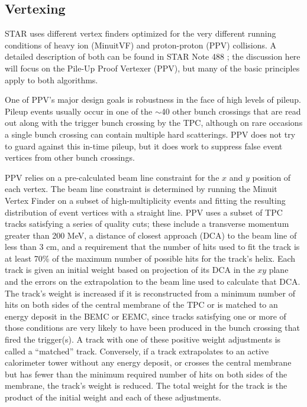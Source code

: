 \subsection{Vertexing}

STAR uses different vertex finders optimized for the very different running
conditions of heavy ion (MinuitVF) and proton-proton (PPV) collisions. A
detailed description of both can be found in STAR Note 488
\cite{vertex-finder-starnote}; the discussion here will focus on the Pile-Up
Proof Vertexer (PPV), but many of the basic principles apply to both
algorithms.

One of PPV's major design goals is robustness in the face of high levels of
pileup. Pileup events usually occur in one of the $\sim$40 other bunch
crossings that are read out along with the trigger bunch crossing by the TPC,
although on rare occasions a single bunch crossing can contain multiple hard
scatterings. PPV does not try to guard against this in-time pileup, but it
does work to suppress false event vertices from other bunch crossings.

PPV relies on a pre-calculated beam line constraint for the $x$ and $y$
position of each vertex. The beam line constraint is determined by running the
Minuit Vertex Finder on a subset of high-multiplicity events and fitting the
resulting distribution of event vertices with a straight line. PPV uses a
subset of TPC tracks satisfying a series of quality cuts; these include a
transverse momentum greater than 200 MeV, a distance of closest approach (DCA)
to the beam line of less than 3 cm, and a requirement that the number of hits
used to fit the track is at least 70\% of the maximum number of possible hits
for the track's helix. Each track is given an initial weight based on
projection of its DCA in the $xy$ plane and the errors on the extrapolation to
the beam line used to calculate that DCA. The track's weight is increased if
it is reconstructed from a minimum number of hits on both sides of the central
membrane of the TPC or is matched to an energy deposit in the BEMC or EEMC,
since tracks satisfying one or more of those conditions are very likely to
have been produced in the bunch crossing that fired the trigger(s). A track
with one of these positive weight adjustments is called a ``matched'' track.
Conversely, if a track extrapolates to an active calorimeter tower without any
energy deposit, or crosses the central membrane but has fewer than the minimum
required number of hits on both sides of the membrane, the track's weight is
reduced. The total weight for the track is the product of the initial weight
and each of these adjustments.

